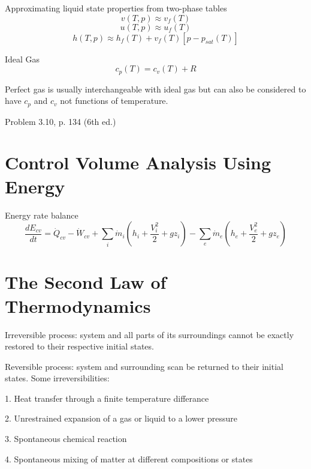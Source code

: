 \documentclass[paper=letter, fontsize=11pt]{scrartcl}
\numberwithin{equation}{section}        %
\numberwithin{figure}{section}          %
\numberwithin{table}{section}               %
\begin{document}
Approximating liquid state properties from two-phase tables
\begin{equation}
    v(T,p)\approx v_f(T)
\end{equation}
\begin{equation}
    u(T,p)\approx u_f(T)
\end{equation}
\begin{equation}
    h(T,p)\approx h_f(T) + v_f(T)[p-p_{sat}(T)]
\end{equation}

Ideal Gas
\begin{equation}
    c_p(T) = c_v(T)+R
\end{equation}

Perfect gas is usually interchangeable with ideal gas but can also be considered to have $c_p$ and $c_v$ not functions of temperature.

Problem 3.10, p. 134 (6th ed.)

\section{Control Volume Analysis Using Energy}

Energy rate balance
\begin{equation}
    \frac{dE_{cv}}{dt} = \dot Q_{cv} -  \dot W_{cv} + \sum_i \dot m_i \left(h_i + \frac{V_i^2}{2} + gz_i \right) - \sum_e \dot m_e \left(h_e + \frac{V_e^2}{2} + gz_e \right) 
\end{equation}

\section{The Second Law of Thermodynamics}

Irreversible process: system and all parts of its surroundings cannot be exactly restored to their respective initial states.

Reversible process: system and surrounding scan be returned to their initial states.
\newline
\newline
Some irreversibilities:

1. Heat transfer through a finite temperature differance

2. Unrestrained expansion of a gas or liquid to a lower pressure

3. Spontaneous chemical reaction

4. Spontaneous mixing of matter at different compositions or states
\end{document}
